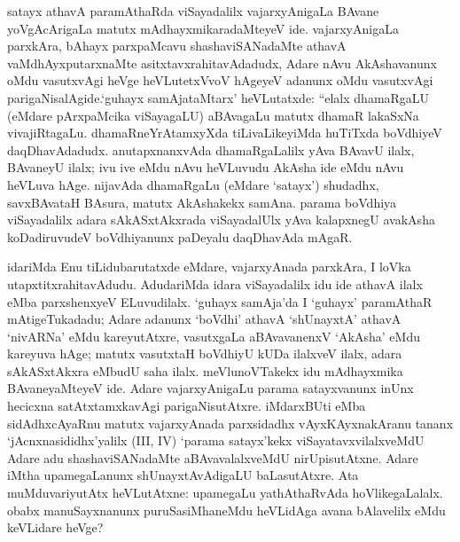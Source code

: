 satayx athavA paramAthaRda viSayadalilx vajarxyAnigaLa BAvane yoVgAcArigaLa matutx mAdhayxmikaradaMteyeV ide. vajarxyAnigaLa parxkAra, bAhayx parxpaMcavu shashaviSANadaMte athavA vaMdhAyxputarxnaMte asitxtavxrahitavAdadudx, Adare nAvu AkAshavanunx oMdu vasutxvAgi heVge heVLutetxVvoV hAgeyeV adanunx oMdu vasutxvAgi parigaNisalAgide.`guhayx samAjataMtarx' heVLutatxde: ``elalx dhamaRgaLU (eMdare pArxpaMcika viSayagaLU) aBAvagaLu matutx dhamaR lakaSxNa vivajiRtagaLu. dhamaRneYrAtamxyXda tiLivaLikeyiMda huTiTxda boVdhiyeV daqDhavAdadudx. anutapxnanxvAda dhamaRgaLalilx yAva BAvavU ilalx, BAvaneyU ilalx; ivu ive eMdu nAvu heVLuvudu AkAsha ide eMdu nAvu heVLuva hAge. nijavAda dhamaRgaLu (eMdare `satayx') shudadhx, savxBAvataH BAsura, matutx AkAshakekx samAna. parama boVdhiya viSayadalilx adara sAkASxtAkxrada viSayadalUlx yAva kalapxnegU avakAsha koDadiruvudeV boVdhiyanunx paDeyalu daqDhavAda mAgaR.

idariMda Enu tiLidubarutatxde eMdare, vajarxyAnada parxkAra, I loVka utapxtitxrahitavAdudu. AdudariMda idara viSayadalilx idu ide athavA ilalx eMba parxshenxyeV ELuvudilalx. `guhayx samAja'da I `guhayx' paramAthaR mAtigeTukadadu; Adare adanunx `boVdhi' athavA `shUnayxtA' athavA `nivARNa' eMdu kareyutAtxre, vasutxgaLa aBAvavanenxV `AkAsha' eMdu kareyuva hAge; matutx vasutxtaH boVdhiyU kUDa ilalxveV ilalx, adara sAkASxtAkxra eMbudU saha ilalx. meVlunoVTakekx idu mAdhayxmika BAvaneyaMteyeV ide. Adare vajarxyAnigaLu parama satayxvanunx inUnx hecicxna satAtxtamxkavAgi parigaNisutAtxre. iMdarxBUti eMba sidAdhxcAyaRnu matutx vajarxyAnada parxsidadhx vAyxKAyxnakAranu tananx `jAcnxnasididhx'yalilx {\rm (III, IV)} `parama satayx'kekx viSayatavxvilalxveMdU Adare adu shashaviSANadaMte aBAvavalalxveMdU nirUpisutAtxne. Adare iMtha upamegaLanunx shUnayxtAvAdigaLU baLasutAtxre. Ata muMduvariyutAtx heVLutAtxne: upamegaLu yathAthaRvAda hoVlikegaLalalx. obabx manuSayxnanunx puruSasiMhaneMdu heVLidAga avana bAlavelilx eMdu keVLidare heVge?

